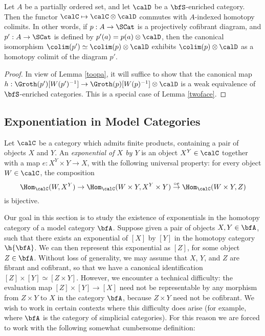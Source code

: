 \begin{Simplicial Categories}
\begin{theorem}\label{tubba}
Let $A$ be a partially ordered set, and let $\calD$ be a $\bfS$-enriched category.
Then the functor $\calC \mapsto \calC \otimes \calD$ commutes with $A$-indexed homotopy colimits. In other words, if $p: A \rightarrow \SCat$ is a projectively cofibrant diagram,
and $p': A \rightarrow \SCat$ is defined by $p'(a) = p(a) \otimes \calD$, then the canonical isomorphism $\colim(p') \simeq \colim(p) \otimes \calD$ exhibits $\colim(p) \otimes \calD$
as a homotopy colimit of the diagram $p'$.
\end{theorem}

\begin{proof}
In view of Lemma \ref{toopa}, it will suffice to show that the canonical map
$h: \Groth(p')[ W(p')^{-1} ] \rightarrow \Groth(p)[W(p)^{-1}] \otimes \calD$
is a weak equivalence of $\bfS$-enriched categories. This is a special case of
Lemma \ref{twoface}.
\end{proof}

\subsection{Exponentiation in Model Categories}\label{camper}

Let $\calC$ be a category which admits finite products, containing a pair of objects $X$ and $Y$.
An {\it exponential of $X$ by $Y$} is an object $X^Y \in \calC$ together with a map
$e: X^Y \times Y \rightarrow X$, with the following universal property: for every
object $W \in \calC$, the composition
$$ \Hom_{\calC}( W, X^Y) \rightarrow \Hom_{\calC}( W \times Y, X^Y \times Y)
\stackrel{\circ e}{\rightarrow} \Hom_{\calC}(W \times Y, Z)$$
is bijective.

Our goal in this section is to study the existence of exponentials in the homotopy category
of a model category $\bfA$. Suppose given a pair of objects $X, Y \in \bfA$, such that there
exists an exponential of $[X]$ by $[Y]$ in the homotopy category $\h{\bfA}$. 
We can then represent this exponential as $[Z]$, for some object $Z \in \bfA$. 
Without loss of generality, we may assume that $X$, $Y$, and $Z$ are fibrant and cofibrant,
so that we have a canonical identification $[Z] \times [Y] \simeq [Z \times Y]$. However,
we encounter a technical difficulty: the evaluation map $[Z] \times [Y] \rightarrow [X]$ need
not be representable by any morphism from $Z \times Y$ to $X$ in the category $\bfA$, because
$Z \times Y$ need not be cofibrant. We wish to work in certain contexts where this difficulty
does arise (for example, where $\bfA$ is the category of simplicial categories). For this reason we are forced to work with the following somewhat cumbersome definition:


\end{Simplicial Categories}
